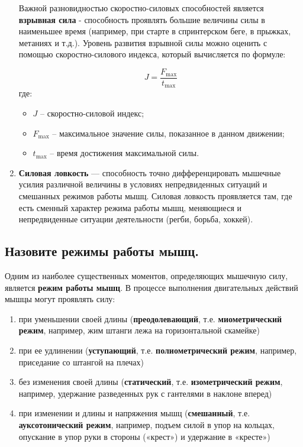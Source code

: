 \begin{enumerate}
          Важной разновидностью скоростно-силовых способностей является \textbf{взрывная сила} - способность проявлять большие величины
          силы в наименьшее время (например, при старте в спринтерском беге, в прыжках, метаниях и т.д.).
          Уровень развития взрывной силы можно оценить с помощью скоростно-силового индекса, который вычисляется по формуле:

          \begin{equation}
              J = \frac{F_{\text{max}}}{t_{\text{max}}}
          \end{equation}
          где:
          \begin{itemize}
              \item $J$ – скоростно-силовой индекс;
              \item $F_{\text{max}}$ – максимальное значение силы, показанное в данном
                    движении;
              \item $t_{\text{max}}$ – время достижения максимальной силы.
          \end{itemize}

    \item \textbf{Силовая ловкость} --- способность точно дифференцировать мышечные усилия различной величины в условиях
          непредвиденных ситуаций и смешанных режимов работы мышц. Силовая ловкость проявляется там, где есть сменный характер
          режима работы мышц, меняющиеся и непредвиденные ситуации деятельности (регби, борьба, хоккей).
\end{enumerate}


\subsection{Назовите режимы работы мышц.}

Одним из наиболее существенных моментов, определяющих мышечную силу, является \textbf{режим работы мышц}. В процессе выполнения
двигательных действий мышцы могут проявлять силу:

\begin{enumerate}
    \item при уменьшении своей длины (\textbf{преодолевающий}, т.е. \textbf{миометрический режим}, например,
          жим штанги лежа на горизонтальной скамейке)
    \item при ее удлинении (\textbf{уступающий}, т.е. \textbf{полиометрический режим}, например, приседание со штангой на плечах)
    \item без изменения своей длины (\textbf{статический}, т.е. \textbf{изометрический режим}, например, удержание разведенных рук
          с гантелями в наклоне вперед)
    \item при изменении и длины и напряжения мышц (\textbf{смешанный}, т.е. \textbf{ауксотонический режим}, например, подъем силой в упор
          на кольцах, опускание в упор руки в стороны («крест») и удержание в «кресте»)
\end{enumerate}

